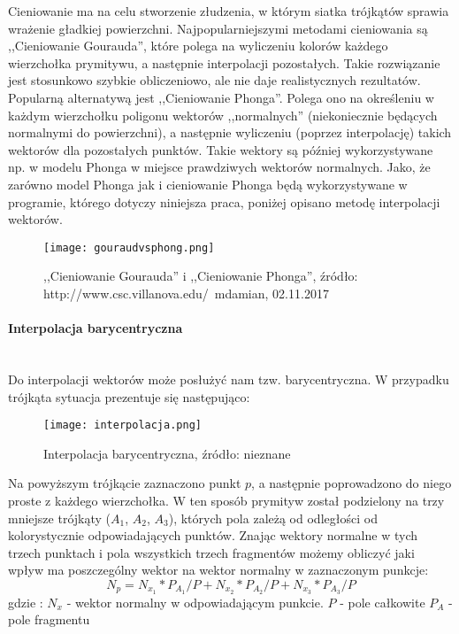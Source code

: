 Cieniowanie ma na celu stworzenie złudzenia, w którym siatka trójkątów sprawia wrażenie gładkiej powierzchni. Najpopularniejszymi metodami cieniowania są ,,Cieniowanie Gourauda'', które polega na wyliczeniu kolorów każdego wierzchołka prymitywu, a następnie interpolacji pozostałych. Takie rozwiązanie jest stosunkowo szybkie obliczeniowo, ale nie daje realistycznych rezultatów. Popularną alternatywą jest ,,Cieniowanie Phonga''. Polega ono na określeniu w każdym wierzchołku poligonu wektorów ,,normalnych'' (niekoniecznie będących normalnymi do powierzchni), a następnie wyliczeniu (poprzez interpolację) takich wektorów dla pozostałych punktów. Takie wektory są później wykorzystywane np. w modelu Phonga w miejsce prawdziwych wektorów normalnych. Jako, że zarówno model Phonga jak i cieniowanie Phonga będą wykorzystywane w programie, którego dotyczy niniejsza praca, poniżej opisano metodę interpolacji wektorów.



\begin{figure}[h!]
\centering
  \caption{,,Cieniowanie Gourauda'' i ,,Cieniowanie Phonga'', źródło: http://www.csc.villanova.edu/~mdamian, 02.11.2017}
  \texttt{[image: gouraudvsphong.png]}
\end{figure}


\paragraph{Interpolacja barycentryczna}\mbox{} \\

Do interpolacji wektorów może posłużyć nam tzw. barycentryczna. W przypadku trójkąta sytuacja prezentuje się następująco:

\begin{figure}[h!]
\centering
  \caption{Interpolacja barycentryczna, źródło: nieznane}
  \texttt{[image: interpolacja.png]}
\end{figure}

Na powyższym trójkącie zaznaczono punkt $p$, a następnie poprowadzono do niego proste z każdego wierzchołka. W ten sposób prymityw został podzielony na trzy mniejsze trójkąty ($A_1$, $A_2$, $A_3$), których pola zależą od odległości od kolorystycznie odpowiadających punktów. Znając wektory normalne w tych trzech punktach i pola wszystkich trzech fragmentów możemy obliczyć jaki wpływ ma poszczególny wektor na wektor normalny w zaznaczonym punkcje:
$$N_p = N_{x_1} * P_{A_1}/P + N_{x_2} * P_{A_2}/P + N_{x_3} * P_{A_3}/P$$
gdzie :
$N_x$ - wektor normalny w odpowiadającym punkcie.
$P$ - pole całkowite
$P_A$ - pole fragmentu

